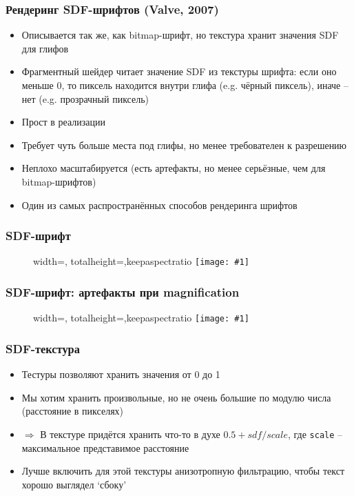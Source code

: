 \documentclass{beamer}
\newcommand{\slideimage}[1]{
  \begin{figure}
    \begin{adjustbox}{width=\textwidth, totalheight=\textheight-2\baselineskip-2\baselineskip,keepaspectratio}
      \texttt{[image: \#1]}
    \end{adjustbox}
  \end{figure}
}
\begin{document}
\begin{frame}[fragile]
\frametitle{Рендеринг SDF-шрифтов (Valve, 2007)}
\begin{itemize}
\item Описывается так же, как bitmap-шрифт, но текстура хранит значения SDF для глифов
\pause
\item Фрагментный шейдер читает значение SDF из текстуры шрифта: если оно меньше 0, то пиксель находится внутри глифа (e.g. чёрный пиксель), иначе -- нет (e.g. прозрачный пиксель)
\pause
\item Прост в реализации
\pause
\item Требует чуть больше места под глифы, но менее требователен к разрешению
\pause
\item Неплохо масштабируется (есть артефакты, но менее серьёзные, чем для bitmap-шрифтов)
\pause
\item Один из самых распространённых способов рендеринга шрифтов
\end{itemize}
\end{frame}

\begin{frame}[fragile]
\frametitle{SDF-шрифт}
\slideimage{sdf-font.png}
\end{frame}

\begin{frame}[fragile]
\frametitle{SDF-шрифт: артефакты при magnification}
\slideimage{sdf-artifacts.jpg}
\end{frame}

\begin{frame}[fragile]
\frametitle{SDF-текстура}
\begin{itemize}
\item Тестуры позволяют хранить значения от 0 до 1
\pause
\item Мы хотим хранить произвольные, но не очень большие по модулю числа (расстояние в пикселях)
\pause
\item \begin{math}\Rightarrow\end{math} В текстуре придётся хранить что-то в духе \begin{math}0.5 + sdf / scale\end{math}, где \verb|scale| -- максимальное представимое расстояние
\pause
\item Лучше включить для этой текстуры анизотропную фильтрацию, чтобы текст хорошо выглядел `сбоку'
\end{itemize}
\end{frame}
\end{document}
